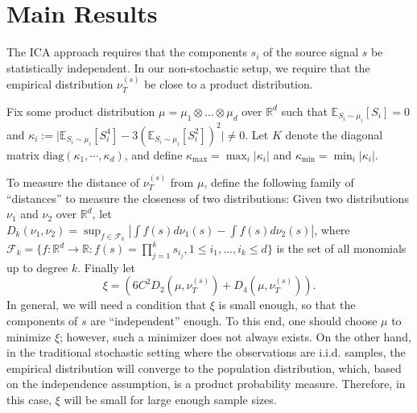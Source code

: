\documentclass[twoside,11pt]{article}
\newcommand{\todoa}[2][]{ \todo[color=Purple!20,size=\tiny,#1]{#2}} %
\newcommand{\cN}{\cal{N}}
\newcommand{\E}{\mathbb{E}}
\newcommand{\real}{\mathbb{R}}
\newcommand{\R}{\real}
\newcommand{\iid}{i.i.d.\xspace}
\newcommand{\eps}{\epsilon}
\begin{document}

\section{Main Results}
\label{sec:main}

The ICA approach requires that the components $s_i$ of the source signal $s$ be statistically independent. In our non-stochastic setup, we require that the empirical distribution $\nu_T^{(s)}$ be close to a product distribution.

Fix some product distribution $\mu= \mu_1\otimes \ldots \otimes \mu_d$ over $\R^d$ 
such that $\E_{S_i\sim\mu_i}[S_i]=0$ and $\kappa_i := \vert \E_{S_i\sim \mu_i}[S_i^4] - 3\left(\E_{S_i\sim \mu_i}[S_i^2]\right)^2 \vert \neq 0$. Let
$K$ denote the diagonal matrix $\text{diag}(\kappa_1,\cdots,\kappa_d)$, and define $\kappa_{\max}=\max_{i} |\kappa_i|$ and $\kappa_{\min}=\min_{i} |\kappa_i|$.

To measure the distance of $\nu_T^{(s)}$ from $\mu$, define the following family of ``distances'' to measure the closeness of two distributions: Given two distributions $\nu_1$ and $\nu_2$ over $\R^d$, let $D_k(\nu_1,\nu_2) = \sup_{f\in\mathcal{F}_k} |\int f(s)d\nu_1(s) - \int f(s)d\nu_2(s)|$, where $\mathcal{F}_k=\{f:\R^d \to \R : f(s)=\prod_{j=1}^k s_{i_j}, 1 \le i_1,\ldots,i_k \le d\}$ is the set of all monomials up to degree $k$. Finally let
\begin{equation}
\label{eq:xi}
\xi = \left( 6C^2D_2(\mu, \nu_T^{(s)}) + D_4(\mu, \nu_T^{(s)})\right).
\end{equation}
In general, we will need a condition that $\xi$ is small enough, so that the components of $s$ are ``independent'' enough. To this end, one should choose
$\mu$ to minimize $\xi$; however, such a minimizer does not always exists.
On the other hand, in the traditional stochastic setting where the observations are \iid samples, the empirical distribution will converge to the population distribution, which, based on the independence assumption, is a product probability measure. 
Therefore, in this case, $\xi$ will be small for large enough sample sizes. 
\end{document}
